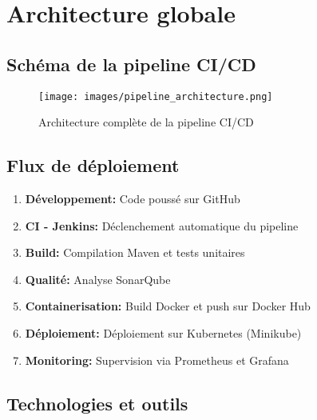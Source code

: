 \documentclass[12pt,a4paper]{article}
\begin{document}
\newpage

\section{Architecture globale}

\subsection{Schéma de la pipeline CI/CD}

\begin{figure}[H]
    \centering
    \texttt{[image: images/pipeline\_architecture.png]}
    \caption{Architecture complète de la pipeline CI/CD}
    \label{fig:pipeline_arch}
\end{figure}

\subsection{Flux de déploiement}

\begin{enumerate}
    \item \textbf{Développement:} Code poussé sur GitHub
    \item \textbf{CI - Jenkins:} Déclenchement automatique du pipeline
    \item \textbf{Build:} Compilation Maven et tests unitaires
    \item \textbf{Qualité:} Analyse SonarQube
    \item \textbf{Containerisation:} Build Docker et push sur Docker Hub
    \item \textbf{Déploiement:} Déploiement sur Kubernetes (Minikube)
    \item \textbf{Monitoring:} Supervision via Prometheus et Grafana
\end{enumerate}

\subsection{Technologies et outils}
\end{document}
